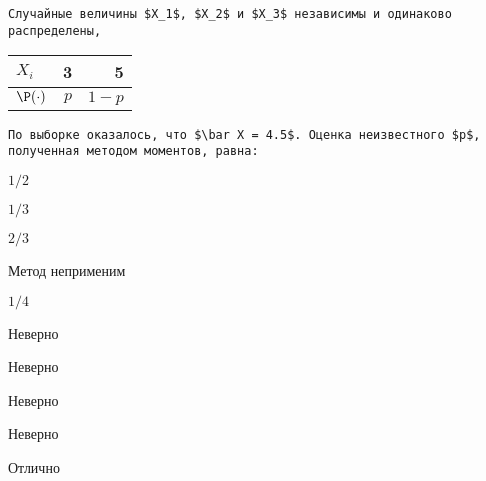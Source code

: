 
\begin{question}
\begin{verbatim}
Случайные величины $X_1$, $X_2$ и $X_3$ независимы и одинаково распределены,
\end{verbatim}

\begin{center}
    \begin{tabular}{lrr} \toprule
    $X_i$ & 3 & 5 \\
    \midrule
    $\P(\cdot)$ & $p$ & $1-p$ \\
    \bottomrule
    \end{tabular}
\end{center}

\begin{verbatim}
По выборке оказалось, что $\bar X = 4.5$. Оценка неизвестного $p$, полученная методом моментов, равна:
\end{verbatim}
\begin{answerlist}
  \item \(1/2\)
  \item \(1/3\)
  \item \(2/3\)
  \item Метод неприменим
  \item \(1/4\)
\end{answerlist}
\end{question}

\begin{solution}
\begin{answerlist}
  \item Неверно
  \item Неверно
  \item Неверно
  \item Неверно
  \item Отлично
\end{answerlist}
\end{solution}

